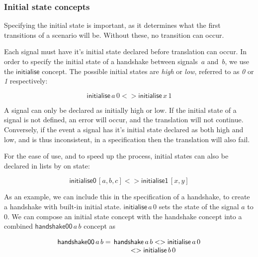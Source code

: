 \documentclass[british,conference,compsoc]{IEEEtran}
\begin{document}
\vspace{-4mm}

\subsubsection{Initial state concepts\label{sub:initState}}

Specifying the initial state is important, as it determines what the first 
transitions of a scenario will be. Without these, no transition can occur.

Each signal must have it's initial state declared before translation can occur. 
In order to specify the initial state of a handshake between signals~$a$
and~$b$, we use the $\mathsf{initialise}$ concept.
The possible initial states are \emph{high} or \emph{low}, referred to as 
\emph{0} or \emph{1} respectively:

\vspace{-2mm}

\[
\mathsf{initialise}\,a\,0 <> \mathsf{initialise}\,x\, 1
\]

\vspace{-1mm}

\noindent A signal can only be declared as initially high or low. If the 
initial state of a signal is not defined, an error will occur, and the 
translation will not continue. Conversely, if the event a signal has it's 
initial state declared as both high and low, and is thus inconsistent, in a 
specification then the translation will also fail.

For the ease of use, and to speed up the process, initial states can also be 
declared in lists by on state:

\vspace{-2mm}

\[
\mathsf{initialise0}\, [a, b, c] <> \mathsf{initialise1}\, [x, y]
\]

\vspace{-1mm}

\noindent As an example, we can include this in the specification of a 
handshake, to create a handshake with built-in initial state.
$\mathsf{initialise}\,a\, 0$ sets the state of the signal
$a$ to $0$. We can compose an initial state concept with the handshake concept
into a combined $\mathsf{handshake00}\,a\, b$ concept as

\vspace{-3mm}

\[
\begin{array}{lcl}
\mathsf{handshake00}\, a\, b =&\hspace{-2mm}\mathsf{handshake}\,a\, b 
	<> \mathsf{initialise}\,a\, 0 \\
&\hspace{-6mm}<> \mathsf{initialise}\,b\, 0
\end{array}
\]
\end{document}

